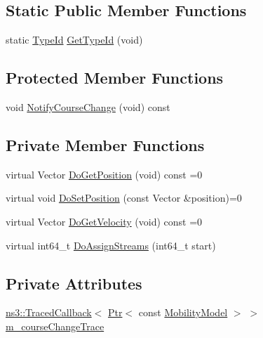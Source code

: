 \subsection*{Static Public Member Functions}
\begin{DoxyCompactItemize}
\item 
static \hyperlink{classns3_1_1TypeId}{Type\+Id} \hyperlink{classns3_1_1MobilityModel_a3d1346ba74cc805812fac131070ba439}{Get\+Type\+Id} (void)
\end{DoxyCompactItemize}
\subsection*{Protected Member Functions}
\begin{DoxyCompactItemize}
\item 
void \hyperlink{classns3_1_1MobilityModel_add1317917ac801284c2467a68f09fbe5}{Notify\+Course\+Change} (void) const 
\end{DoxyCompactItemize}
\subsection*{Private Member Functions}
\begin{DoxyCompactItemize}
\item 
virtual Vector \hyperlink{classns3_1_1MobilityModel_a518f70bd8cb78d0031f9a26572434c34}{Do\+Get\+Position} (void) const =0
\item 
virtual void \hyperlink{classns3_1_1MobilityModel_aa2f52cd86754da71ac649413c049785e}{Do\+Set\+Position} (const Vector \&position)=0
\item 
virtual Vector \hyperlink{classns3_1_1MobilityModel_aeb712201a80442ef941d4b460f98aebf}{Do\+Get\+Velocity} (void) const =0
\item 
virtual int64\+\_\+t \hyperlink{classns3_1_1MobilityModel_aa8aa889c9d2d49903a547d58ff5cbadf}{Do\+Assign\+Streams} (int64\+\_\+t start)
\end{DoxyCompactItemize}
\subsection*{Private Attributes}
\begin{DoxyCompactItemize}
\item 
\hyperlink{classns3_1_1TracedCallback}{ns3\+::\+Traced\+Callback}$<$ \hyperlink{classns3_1_1Ptr}{Ptr}$<$ const \hyperlink{classns3_1_1MobilityModel}{Mobility\+Model} $>$ $>$ \hyperlink{classns3_1_1MobilityModel_a0392fd220a8880d5f56e4fb8546c455f}{m\+\_\+course\+Change\+Trace}
\end{DoxyCompactItemize}

